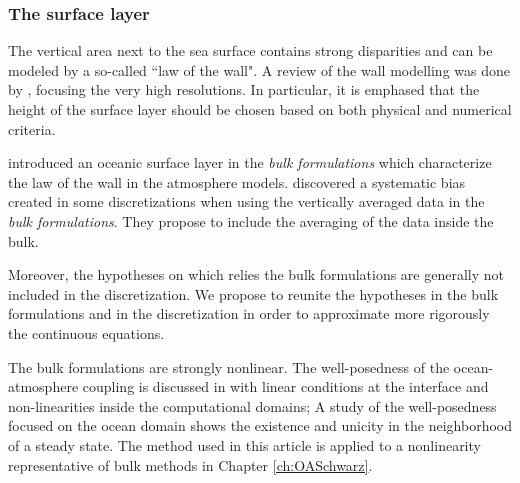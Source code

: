 \subsubsection*{The surface layer}
The vertical area next to the sea surface contains
strong disparities and can be modeled by a so-called
``law of the wall". A review of the wall modelling was done by
\citep{larsson_large_2016}, focusing the very high resolutions.
In particular, it is emphased that the height of the surface layer
should be chosen based on both physical and numerical criteria.
\par
\citep{pelletier_two-sided_2021} introduced an oceanic surface layer
in the \textit{bulk formulations} which characterize the law of
the wall in the atmosphere models.
\citep{nishizawa_surface_2018} discovered a systematic bias
created in some discretizations when using the vertically
averaged data in the \textit{bulk formulations}. They propose to
include the averaging of the data inside the bulk.
\par
Moreover, the hypotheses on which relies the bulk formulations
are generally not included in the discretization.
We propose to reunite the hypotheses in the bulk formulations
and in the discretization in order to
approximate more rigorously the continuous equations.
\par
The bulk formulations are strongly nonlinear.
The well-posedness of the ocean-atmosphere coupling is discussed
in \citep{lions_mathematical_1995} with linear conditions at
the interface and non-linearities inside the computational domains;
A study of the well-posedness focused on the ocean domain
\citep{chacon-rebollo_existence_2014} shows the existence and
unicity in the neighborhood of a steady state. The method
used in this article is applied to a nonlinearity
representative of bulk methods in Chapter
\ref{ch:OASchwarz}.
%
